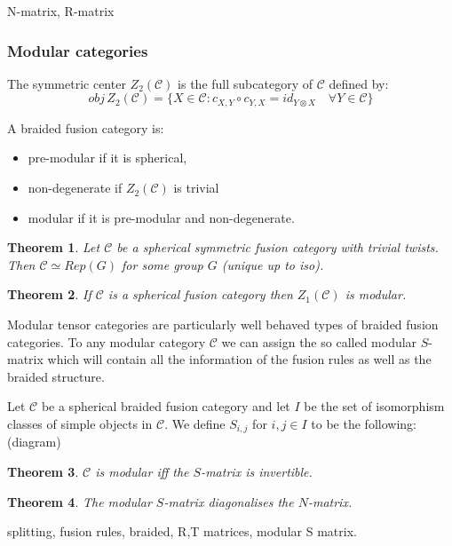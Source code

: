 \documentclass{article}
\newtheorem{theorem}{Theorem}[section]
\newenvironment{definition}[1][Definition]{\begin{trivlist}
\item[\hskip \labelsep {\bfseries #1}]}{\end{trivlist}}
\begin{document}
N-matrix, R-matrix


\subsubsection{Modular categories}

\begin{definition}
The symmetric center $Z_2(\mathcal{C})$ is the full subcategory of $\mathcal{C}$ defined by:
$$ obj \, Z_2(\mathcal{C}) = \{ X\in \mathcal{C} : c_{X,Y} \circ c_{Y,X} = id_{Y\otimes X} \quad \forall Y \in \mathcal{C} \} $$
\end{definition}
\begin{definition}
A braided fusion category is:
\begin{itemize}
    \item pre-modular if it is spherical,
    \item non-degenerate if $Z_2(\mathcal{C})$ is trivial
    \item modular if it is pre-modular and non-degenerate.
\end{itemize}
\end{definition}

\begin{theorem}
Let $\mathcal{C}$ be a spherical symmetric fusion category with trivial twists. Then $\mathcal{C} \simeq Rep(G)$ for some group $G$ (unique up to iso).
\end{theorem}

\begin{theorem}
If $\mathcal{C}$ is a spherical fusion category then $Z_1(\mathcal{C})$ is modular.
\end{theorem}
Modular tensor categories are particularly well behaved types of braided fusion categories. To any modular category $\mathcal{C}$ we can assign the so called modular $S$-matrix which will contain all the information of the fusion rules as well as the braided structure.
\begin{definition}
Let $\mathcal{C}$ be a spherical braided fusion category and let $I$ be the set of isomorphism classes of simple objects in $\mathcal{C}$. We define $S_{i,j}$ for $i,j \in I$ to be the following: (diagram)
\end{definition}
\begin{theorem}
$\mathcal{C}$ is modular iff the $S$-matrix is invertible.
\end{theorem}
\begin{theorem}
The modular $S$-matrix diagonalises the $N$-matrix.
\end{theorem}
splitting, fusion rules, braided, R,T matrices, modular S matrix.
\end{document}
